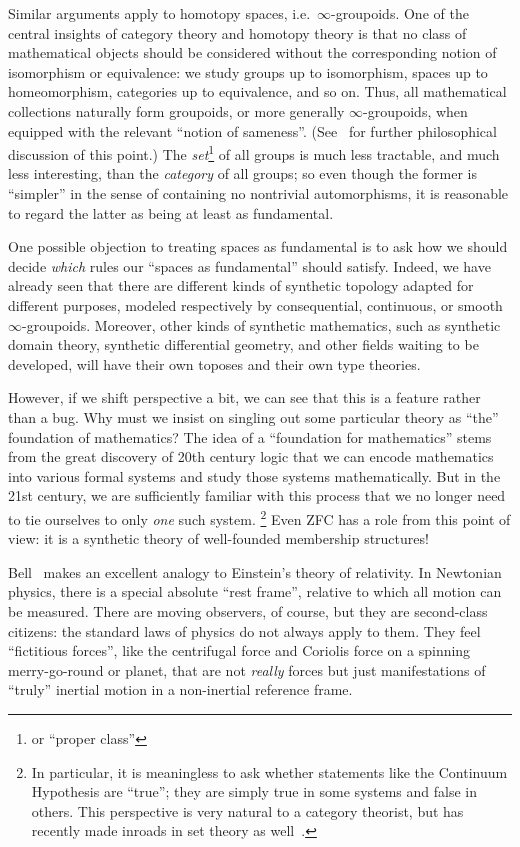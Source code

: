 \documentclass[12pt]{article}
\def\oo{\ensuremath{\infty}}
\numberwithin{equation}{section}
\begin{document}
Similar arguments apply to homotopy spaces, i.e.\ $\oo$-groupoids.
One of the central insights of category theory and homotopy theory is that no class of mathematical objects should be considered without the corresponding notion of isomorphism or equivalence:
we study groups up to isomorphism, spaces up to homeomorphism, categories up to equivalence, and so on.
Thus, all mathematical collections naturally form groupoids, or more generally $\oo$-groupoids, when equipped with the relevant ``notion of sameness''.
(See~\cite{shulman:synhott} for further philosophical discussion of this point.)
The \emph{set}\footnote{or ``proper class''} of all groups is much less tractable, and much less interesting, than the \emph{category} of all groups; so even though the former is ``simpler'' in the sense of containing no nontrivial automorphisms, it is reasonable to regard the latter as being at least as fundamental.

One possible objection to treating spaces as fundamental is to ask how we should decide \emph{which} rules our ``spaces as fundamental'' should satisfy.
Indeed, we have already seen that there are different kinds of synthetic topology adapted for different purposes, modeled respectively by consequential, continuous, or smooth \oo-groupoids.
Moreover, other kinds of synthetic mathematics, such as synthetic domain theory, synthetic differential geometry, and other fields waiting to be developed, will have their own toposes and their own type theories.

However, if we shift perspective a bit, we can see that this is a feature rather than a bug.
Why must we insist on singling out some particular theory as ``the'' foundation of mathematics?
The idea of a ``foundation for mathematics'' stems from the great discovery of 20th century logic that we can encode mathematics into various formal systems and study those systems mathematically.
But in the 21st century, we are sufficiently familiar with this process that we no longer need to tie ourselves to only \emph{one} such system.%
\footnote{In particular, it is meaningless to ask whether statements like the Continuum Hypothesis are ``true''; they are simply true in some systems and false in others.
This perspective is very natural to a category theorist, but has recently made inroads in set theory as well~\cite{hamkins:multiverse}.}
Even ZFC has a role from this point of view: it is a synthetic theory of well-founded membership structures!

Bell~\cite{bell:topos-lst} makes an excellent analogy to Einstein's theory of relativity.
In Newtonian physics, there is a special absolute ``rest frame'', relative to which all motion can be measured.
There are moving observers, of course, but they are second-class citizens: the standard laws of physics do not always apply to them.
They feel ``fictitious forces'', like the centrifugal force and Coriolis force on a spinning merry-go-round or planet, that are not \emph{really} forces but just manifestations of ``truly'' inertial motion in a non-inertial reference frame.
\end{document}
